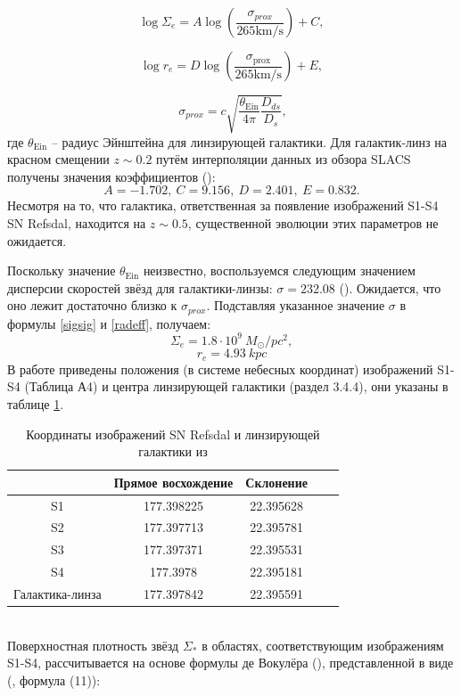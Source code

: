 \begin{equation}\label{sigsig}
\log \Sigma_{e}=A \log \left(\frac{\sigma_{p r o x}}{265  \mathrm{km} / \mathrm{s}}\right)+C,
\end{equation}

\begin{equation}\label{radeff}
\log r_{e}=D \log \left(\frac{\sigma_{\text {prox}}}{265 \mathrm{km} / \mathrm{s}}\right)+E,
\end{equation}

\begin{equation}\label{sigmaprox}
 \ \sigma_{prox}=c \sqrt{\frac{\theta_{\text {Ein}}}{4 \pi} \frac{D_{ds}}{D_{s}}},
\end{equation}
где $\theta_{\text {Ein}}$ -- радиус Эйнштейна для линзирующей галактики. Для галактик-линз на красном смещении $z \sim 0.2$ путём интерполяции данных из обзора SLACS получены значения коэффициентов (\cite{schechter2014}): $$ A = -1.702, \ C = 9.156, \ D = 2.401, \ E = 0.832. $$ Несмотря на то, что галактика, ответственная за появление изображений S1-S4 SN Refsdal, находится на $z \sim 0.5$, существенной эволюции этих параметров не ожидается. 


Поскольку значение $\theta_{\text {Ein}}$ неизвестно, воспользуемся следующим значением дисперсии скоростей звёзд для галактики-линзы: $\sigma = 232.08$ (\cite{kawamataoguri}). Ожидается, что оно лежит достаточно близко к $\sigma_{prox}$. Подставляя указанное  значение $\sigma$ в формулы \eqref{sigsig} и \eqref{radeff}, получаем: $$\Sigma_e = 1.8 \cdot 10^9 \ M_{\odot}/pc^2,$$ $$r_e=4.93 \ kpc$$
В работе \cite{kawamataoguri} приведены положения (в системе небесных координат) изображений S1-S4 (Таблица А4) и центра линзирующей галактики (раздел 3.4.4), они указаны в таблице \ref{tab:coord}.

\begin{table}[h!]
  \caption{Координаты изображений SN Refsdal и линзирующей галактики из \cite{kawamataoguri}}
  \label{tab:coord}
  \centering
    \begin{tabular}{ | c | c | c | c | c |}
    \hline
     & Прямое восхождение & Склонение \\ \hline
    S1 & 177.398225 & 22.395628 \\ \hline
    S2 & 177.397713 & 22.395781 \\\hline
    S3 & 177.397371 & 22.395531 \\ \hline
    S4 & 177.3978   & 22.395181 \\\hline
    Галактика-линза & 177.397842 & 22.395591 \\\hline
    \end{tabular}
\end{table}
\\
Поверхностная плотность звёзд $\Sigma_*$ в областях, соответствующим изображениям S1-S4, рассчитывается на основе формулы де Вокулёра (\cite{vaucouleurs}), представленной в виде (\cite{schechter2014}, формула (11)):

